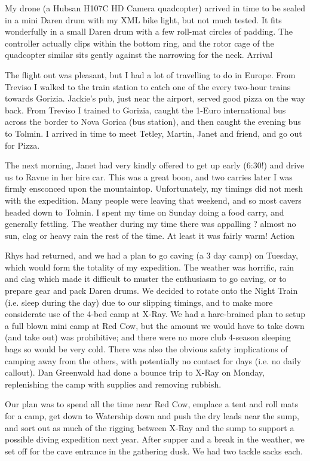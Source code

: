 \documentclass[onecolumn]{book}
\begin{document}
My drone (a Hubsan H107C HD Camera quadcopter) arrived in time to be sealed in a mini Daren drum with my XML bike light, but not much tested. It fits wonderfully in a small Daren drum with a few roll-mat circles of padding. The controller actually clips within the bottom ring, and the rotor cage of the quadcopter similar sits gently against the narrowing for the neck.
Arrival

The flight out was pleasant, but I had a lot of travelling to do in Europe. From Treviso I walked to the train station to catch one of the every two-hour trains towards Gorizia. Jackie's pub, just near the airport, served good pizza on the way back. From Treviso I trained to Gorizia, caught the 1-Euro international bus across the border to Nova Gorica (bus station), and then caught the evening bus to Tolmin. I arrived in time to meet Tetley, Martin, Janet and friend, and go out for Pizza.

The next morning, Janet had very kindly offered to get up early (6:30!) and drive us to Ravne in her hire car. This was a great boon, and two carries later I was firmly ensconced upon the mountaintop. Unfortunately, my timings did not mesh with the expedition. Many people were leaving that weekend, and so most cavers headed down to Tolmin. I spent my time on Sunday doing a food carry, and generally fettling. The weather during my time there was appalling ? almost no sun, clag or heavy rain the rest of the time. At least it was fairly warm!
Action

Rhys had returned, and we had a plan to go caving (a 3 day camp) on Tuesday, which would form the totality of my expedition. The weather was horrific, rain and clag which made it difficult to muster the enthusiasm to go caving, or to prepare gear and pack Daren drums. We decided to rotate onto the Night Train (i.e. sleep during the day) due to our slipping timings, and to make more considerate use of the 4-bed camp at X-Ray. We had a hare-brained plan to setup a full blown mini camp at Red Cow, but the amount we would have to take down (and take out) was prohibitive; and there were no more club 4-season sleeping bags so would be very cold. There was also the obvious safety implications of camping away from the others, with potentially no contact for days (i.e. no daily callout). Dan Greenwald had done a bounce trip to X-Ray on Monday, replenishing the camp with supplies and removing rubbish.

Our plan was to spend all the time near Red Cow, emplace a tent and roll mats for a camp, get down to Watership down and push the dry leads near the sump, and sort out as much of the rigging between X-Ray and the sump to support a possible diving expedition next year.
After supper and a break in the weather, we set off for the cave entrance in the gathering dusk. We had two tackle sacks each.
\end{document}
